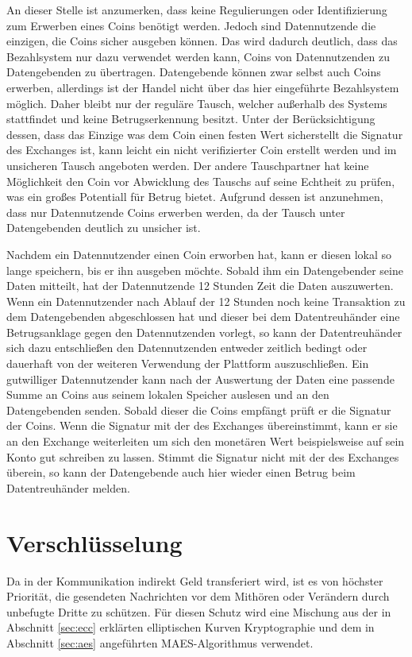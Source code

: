 \documentclass{scrreprt}
\begin{document}
An dieser Stelle ist anzumerken, dass keine Regulierungen oder Identifizierung zum Erwerben eines Coins benötigt werden. Jedoch sind Datennutzende die einzigen, die Coins sicher ausgeben können. Das wird dadurch deutlich, dass das Bezahlsystem nur dazu verwendet werden kann, Coins von Datennutzenden zu Datengebenden zu übertragen. Datengebende können zwar selbst auch Coins erwerben, allerdings ist der Handel nicht über das hier eingeführte Bezahlsystem möglich. Daher bleibt nur der reguläre Tausch, welcher außerhalb des Systems stattfindet und keine Betrugserkennung besitzt. Unter der Berücksichtigung dessen, dass das Einzige was dem Coin einen festen Wert sicherstellt die Signatur des Exchanges ist, kann leicht ein nicht verifizierter Coin erstellt werden und im unsicheren Tausch angeboten werden. Der andere Tauschpartner hat keine Möglichkeit den Coin vor Abwicklung des Tauschs auf seine Echtheit zu prüfen, was ein großes Potentiall für Betrug bietet. Aufgrund dessen ist anzunehmen, dass nur Datennutzende Coins erwerben werden, da der Tausch unter Datengebenden deutlich zu unsicher ist.

Nachdem ein Datennutzender einen Coin erworben hat, kann er diesen lokal so lange speichern, bis er ihn ausgeben möchte. Sobald ihm ein Datengebender seine Daten mitteilt, hat der Datennutzende 12 Stunden Zeit die Daten auszuwerten. Wenn ein Datennutzender nach Ablauf der 12 Stunden noch keine Transaktion zu dem Datengebenden abgeschlossen hat und dieser bei dem Datentreuhänder eine Betrugsanklage gegen den Datennutzenden vorlegt, so kann der Datentreuhänder sich dazu entschließen den Datennutzenden entweder zeitlich bedingt oder dauerhaft von der weiteren Verwendung der Plattform auszuschließen. Ein gutwilliger Datennutzender kann nach der Auswertung der Daten eine passende Summe an Coins aus seinem lokalen Speicher auslesen und an den Datengebenden senden. Sobald dieser die Coins empfängt prüft er die Signatur der Coins. Wenn die Signatur mit der des Exchanges übereinstimmt, kann er sie an den Exchange weiterleiten um sich den monetären Wert beispielsweise auf sein Konto gut schreiben zu lassen. Stimmt die Signatur nicht mit der des Exchanges überein, so kann der Datengebende auch hier wieder einen Betrug beim Datentreuhänder melden.

\section{Verschlüsselung}
Da in der Kommunikation indirekt Geld transferiert wird, ist es von höchster Priorität, die gesendeten Nachrichten vor dem Mithören oder Verändern durch unbefugte Dritte zu schützen. Für diesen Schutz wird eine Mischung aus der in Abschnitt \ref{sec:ecc} erklärten elliptischen Kurven Kryptographie und dem in Abschnitt \ref{sec:aes} angeführten MAES-Algorithmus verwendet. 
\end{document}
